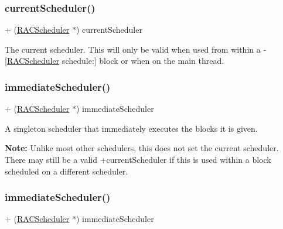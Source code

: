\subsubsection{\texorpdfstring{current\+Scheduler()}{currentScheduler()}\hspace{0.1cm}{\footnotesize\ttfamily [3/3]}}
{\footnotesize\ttfamily + (\mbox{\hyperlink{interface_r_a_c_scheduler}{R\+A\+C\+Scheduler}} $\ast$) current\+Scheduler \begin{DoxyParamCaption}{ }\end{DoxyParamCaption}}

The current scheduler. This will only be valid when used from within a -\/\mbox{[}\mbox{\hyperlink{interface_r_a_c_scheduler}{R\+A\+C\+Scheduler}} schedule\+:\mbox{]} block or when on the main thread. \mbox{\label{interface_r_a_c_scheduler_a78433c164c6e6ca6628eef47c9c087e3}} 
\subsubsection{\texorpdfstring{immediate\+Scheduler()}{immediateScheduler()}\hspace{0.1cm}{\footnotesize\ttfamily [1/3]}}
{\footnotesize\ttfamily + (\mbox{\hyperlink{interface_r_a_c_scheduler}{R\+A\+C\+Scheduler}} $\ast$) immediate\+Scheduler \begin{DoxyParamCaption}{ }\end{DoxyParamCaption}}

A singleton scheduler that immediately executes the blocks it is given.

{\bfseries Note\+:} Unlike most other schedulers, this does not set the current scheduler. There may still be a valid +current\+Scheduler if this is used within a block scheduled on a different scheduler. \mbox{\label{interface_r_a_c_scheduler_a78433c164c6e6ca6628eef47c9c087e3}} 
\subsubsection{\texorpdfstring{immediate\+Scheduler()}{immediateScheduler()}\hspace{0.1cm}{\footnotesize\ttfamily [2/3]}}
{\footnotesize\ttfamily + (\mbox{\hyperlink{interface_r_a_c_scheduler}{R\+A\+C\+Scheduler}} $\ast$) immediate\+Scheduler \begin{DoxyParamCaption}{ }\end{DoxyParamCaption}}

